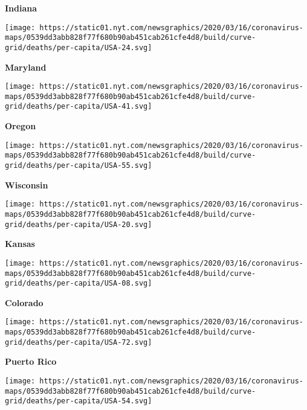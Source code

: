 \textbf{Indiana}

\href{https://www.nytimes.com/interactive/2020/us/maryland-coronavirus-cases.html}{}

\texttt{[image: https://static01.nyt.com/newsgraphics/2020/03/16/coronavirus-maps/0539dd3abb828f77f680b90ab451cab261cfe4d8/build/curve-grid/deaths/per-capita/USA-24.svg]}

\textbf{Maryland}

\href{https://www.nytimes.com/interactive/2020/us/oregon-coronavirus-cases.html}{}

\texttt{[image: https://static01.nyt.com/newsgraphics/2020/03/16/coronavirus-maps/0539dd3abb828f77f680b90ab451cab261cfe4d8/build/curve-grid/deaths/per-capita/USA-41.svg]}

\textbf{Oregon}

\href{https://www.nytimes.com/interactive/2020/us/wisconsin-coronavirus-cases.html}{}

\texttt{[image: https://static01.nyt.com/newsgraphics/2020/03/16/coronavirus-maps/0539dd3abb828f77f680b90ab451cab261cfe4d8/build/curve-grid/deaths/per-capita/USA-55.svg]}

\textbf{Wisconsin}

\href{https://www.nytimes.com/interactive/2020/us/kansas-coronavirus-cases.html}{}

\texttt{[image: https://static01.nyt.com/newsgraphics/2020/03/16/coronavirus-maps/0539dd3abb828f77f680b90ab451cab261cfe4d8/build/curve-grid/deaths/per-capita/USA-20.svg]}

\textbf{Kansas}

\href{https://www.nytimes.com/interactive/2020/us/colorado-coronavirus-cases.html}{}

\texttt{[image: https://static01.nyt.com/newsgraphics/2020/03/16/coronavirus-maps/0539dd3abb828f77f680b90ab451cab261cfe4d8/build/curve-grid/deaths/per-capita/USA-08.svg]}

\textbf{Colorado}

\href{https://www.nytimes.com/interactive/2020/us/puerto-rico-coronavirus-cases.html}{}

\texttt{[image: https://static01.nyt.com/newsgraphics/2020/03/16/coronavirus-maps/0539dd3abb828f77f680b90ab451cab261cfe4d8/build/curve-grid/deaths/per-capita/USA-72.svg]}

\textbf{Puerto Rico}

\href{https://www.nytimes.com/interactive/2020/us/west-virginia-coronavirus-cases.html}{}

\texttt{[image: https://static01.nyt.com/newsgraphics/2020/03/16/coronavirus-maps/0539dd3abb828f77f680b90ab451cab261cfe4d8/build/curve-grid/deaths/per-capita/USA-54.svg]}

